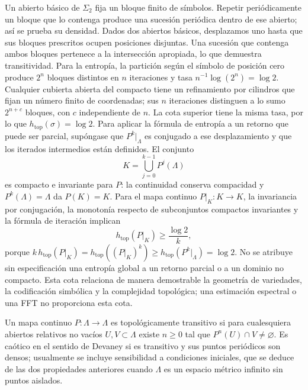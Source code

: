 Un abierto básico de \(\Sigma_2\) fija un bloque finito de símbolos.
Repetir periódicamente un bloque que lo contenga produce una sucesión
periódica dentro de ese abierto; así se prueba su densidad. Dados dos
abiertos básicos, desplazamos uno hasta que sus bloques prescritos ocupen
posiciones disjuntas. Una sucesión que contenga ambos bloques pertenece a
la intersección apropiada, lo que demuestra transitividad.
Para la entropía, la partición según el símbolo de posición cero produce
\(2^n\) bloques distintos en \(n\) iteraciones y tasa
\(n^{-1}\log(2^n)=\log2\). Cualquier cubierta abierta del compacto tiene
un refinamiento por cilindros que fijan un número finito de coordenadas;
sus \(n\) iteraciones distinguen a lo sumo \(2^{n+c}\) bloques, con
\(c\) independiente de \(n\). La cota superior tiene la misma tasa, por
lo que \(h_{\mathrm{top}}(\sigma)=\log2\).
Para aplicar la fórmula de entropía a un retorno que puede ser parcial,
supóngase que \(P^k|_\Lambda\) es conjugado a ese desplazamiento y que los
iterados intermedios están definidos. El conjunto
\[
 K=\bigcup_{j=0}^{k-1}P^j(\Lambda)
\]
es compacto e invariante para \(P\): la continuidad conserva compacidad y
\(P^k(\Lambda)=\Lambda\) da \(P(K)=K\). Para el mapa continuo
\(P|_K:K\to K\), la invariancia por conjugación, la monotonía respecto de
subconjuntos compactos invariantes y la fórmula de iteración implican
\begin{equation}
 h_{\mathrm{top}}(P|_K)\ge\frac{\log2}{k},
 \label{geo:eq:horseshoe-entropy-bound}
\end{equation}
porque
\(k\,h_{\mathrm{top}}(P|_K)
=h_{\mathrm{top}}((P|_K)^k)
\ge h_{\mathrm{top}}(P^k|_\Lambda)=\log2\).
No se atribuye sin especificación una entropía global a un retorno parcial
o a un dominio no compacto. Esta cota relaciona de manera
demostrable la geometría de variedades, la codificación simbólica y la complejidad
topológica; una estimación espectral o una FFT no proporciona esta cota.

\begin{definition}
Un mapa continuo \(P:\Lambda\to\Lambda\) es topológicamente transitivo si para
cualesquiera abiertos relativos no vacíos \(U,V\subset\Lambda\) existe
\(n\ge0\) tal que \(P^n(U)\cap V\ne\varnothing\). Es caótico en el sentido de
Devaney si es transitivo y sus puntos periódicos son densos; usualmente se
incluye sensibilidad a condiciones iniciales, que se deduce de las dos
propiedades anteriores cuando \(\Lambda\) es un espacio métrico infinito sin
puntos aislados.
\end{definition}

